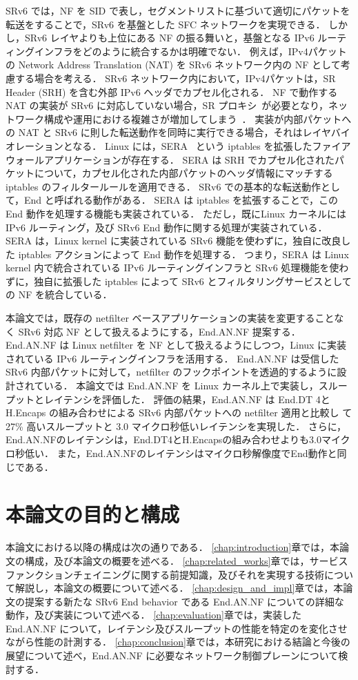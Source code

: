 SRv6 では，NF を SID で表し，セグメントリストに基づいて適切にパケットを転送をすることで，SRv6 を基盤とした SFC ネットワークを実現できる．
しかし，SRv6 レイヤよりも上位にある NF の振る舞いと，基盤となる IPv6 ルーティングインフラをどのように統合するかは明確でない．
例えば，IPv4パケットの Network Address Translation (NAT) を SRv6 ネットワーク内の NF として考慮する場合を考える．
SRv6 ネットワーク内において，IPv4パケットは，SR Header (SRH) を含む外部 IPv6 ヘッダでカプセル化される．
NF で動作する NAT の実装が SRv6 に対応していない場合，SR プロキシ~\cite{ietf-spring-sr-service-programming-08}が必要となり，ネットワーク構成や運用における複雑さが増加してしまう~\cite{draft-scexp}．
実装が内部パケットへの NAT と SRv6 に則した転送動作を同時に実行できる場合，それはレイヤバイオレーションとなる． 
Linux には，SERA~\cite{sera} という iptables を拡張したファイアウォールアプリケーションが存在する．
SERA は SRH でカプセル化されたパケットについて，カプセル化された内部パケットのヘッダ情報にマッチする iptables のフィルタールールを適用できる．
SRv6 での基本的な転送動作として，End と呼ばれる動作がある．
SERA は iptables を拡張することで，この End 動作を処理する機能も実装されている．
ただし，既にLinux カーネルには IPv6 ルーティング，及び SRv6 End 動作に関する処理が実装されている．
SERA は，Linux kernel に実装されている SRv6 機能を使わずに，独自に改良した iptables アクションによって End 動作を処理する．
つまり，SERA は Linux kernel 内で統合されている IPv6 ルーティングインフラと SRv6 処理機能を使わずに，独自に拡張した iptables によって SRv6 とフィルタリングサービスとしての NF を統合している．

本論文では，既存の netfilter ベースアプリケーションの実装を変更することなく SRv6 対応 NF として扱えるようにする，End.AN.NF 提案する．
End.AN.NF は Linux netfilter を NF として扱えるようにしつつ，Linux に実装されている IPv6 ルーティングインフラを活用する．
End.AN.NF は受信した SRv6 内部パケットに対して，netfilter のフックポイントを透過的するように設計されている．
本論文では End.AN.NF を Linux カーネル上で実装し，スループットとレイテンシを評価した．
評価の結果，End.AN.NF は End.DT 4と H.Encaps の組み合わせによる SRv6 内部パケットへの netfilter 適用と比較し て27\% 高いスループットと 3.0 マイクロ秒低いレイテンシを実現した．
さらに，End.AN.NFのレイテンシは，End.DT4とH.Encapsの組み合わせよりも3.0マイクロ秒低い．
また，End.AN.NFのレイテンシはマイクロ秒解像度でEnd動作と同じである．

\section{本論文の目的と構成}
本論文における以降の構成は次の通りである．
\ref*{chap:introduction}章では，本論文の構成，及び本論文の概要を述べる．
\ref*{chap:related_works}章では，サービスファンクションチェイニングに関する前提知識，及びそれを実現する技術について解説し，本論文の概要について述べる．
\ref*{chap:design_and_impl}章では，本論文の提案する新たな SRv6 End behavior である End.AN.NF についての詳細な動作，及び実装について述べる．
\ref*{chap:evaluation}章では，実装した End.AN.NF について，レイテンシ及びスループットの性能を特定のを変化させながら性能の計測する．
\ref*{chap:conclusion}章では，本研究における結論と今後の展望について述べ，End.AN.NF に必要なネットワーク制御プレーンについて検討する．